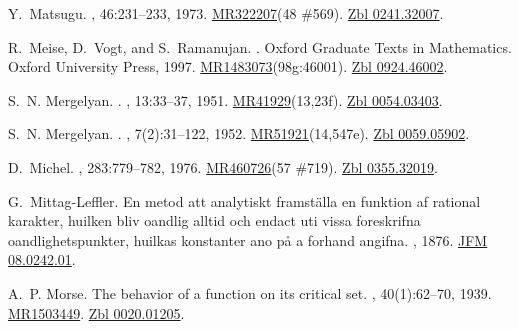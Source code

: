 \documentclass[11pt,a4paper, final, twoside]{article}
\numberwithin{equation}{section}
\begin{document}
\begin{appendices}
\begin{thebibliography}{100}
Y.~Matsugu.
, 46:231--233, 1973.
\newblock \href{http://www.ams.org/mathscinet-getitem?mr=322207}{MR322207}(48
  \#569). \href{http://zbmath.org/?q=an:0241.32007}{Zbl 0241.32007}.

R.~Meise, D.~Vogt, and S.~Ramanujan.
.
\newblock Oxford Graduate Texts in Mathematics. Oxford University Press, 1997.
\newblock
  \href{http://www.ams.org/mathscinet-getitem?mr=1483073}{MR1483073}(98g:46001).
  \href{http://zbmath.org/?q=an:0924.46002}{Zbl 0924.46002}.

S.~N. Mergelyan.
.
, 13:33--37, 1951.
\newblock
  \href{http://www.ams.org/mathscinet-getitem?mr=41929}{MR41929}(13,23f).
  \href{http://zbmath.org/?q=an:0054.03403}{Zbl 0054.03403}.

S.~N. Mergelyan.
.
, 7(2):31--122, 1952.
\newblock
  \href{http://www.ams.org/mathscinet-getitem?mr=51921}{MR51921}(14,547e).
  \href{http://zbmath.org/?q=an:0059.05902}{Zbl 0059.05902}.

D.~Michel.
, 283:779--782, 1976.
\newblock \href{http://www.ams.org/mathscinet-getitem?mr=460726}{MR460726}(57
  \#719). \href{http://zbmath.org/?q=an:0355.32019}{Zbl 0355.32019}.

G.~Mittag-Leffler.
\newblock En metod att analytiskt framst\"alla en funktion af rational
  karakter, huilken bliv oandlig alltid och endact uti vissa foreskrifna
  oandlighetspunkter, huilkas konstanter ano p{\aa} a forhand angifna.
, 1876.
\newblock \href{http://zbmath.org/?q=an:08.0242.01}{JFM 08.0242.01}.

A.~P. Morse.
\newblock The behavior of a function on its critical set.
, 40(1):62--70, 1939.
\newblock \href{http://www.ams.org/mathscinet-getitem?mr=1503449}{MR1503449}.
  \href{http://zbmath.org/?q=an:0020.01205}{Zbl 0020.01205}.


\end{thebibliography}
\end{appendices}
\end{document}
